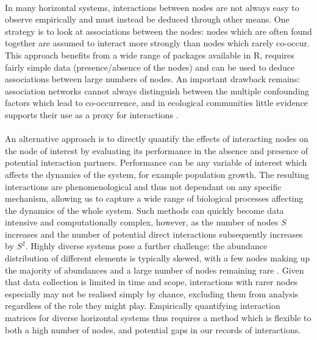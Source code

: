 \documentclass[a4,12pt]{article}
\begin{document}
    \paragraph{} 
    In many horizontal systems, interactions between nodes are not always easy to observe empirically and must instead be deduced through other means. One strategy is to look at associations between the nodes: nodes which are often found together are assumed to interact more strongly than nodes which rarely co-occur. This approach benefits from a wide range of packages available in R, requires fairly simple data (presence/absence of the nodes) and can be used to deduce associations between large numbers of nodes. An important drawback remains: association networks cannot always distinguish between the multiple confounding factors which lead to co-occurrence, and in ecological communities little evidence supports their use as a proxy for interactions \parencite{Sander2017,Barner2018, Thurman2019, Blanchet2020}.

    \paragraph{}
    An alternative approach is to directly quantify the effects of interacting nodes on the node of interest by evaluating its performance in the absence and presence of potential interaction partners. Performance can be any variable of interest which affects the dynamics of the system, for example population growth. The resulting interactions are phenomenological and thus not dependant on any specific mechanism, allowing us to capture a wide range of biological processes affecting the dynamics of the whole system. Such methods can quickly become data intensive and computationally complex, however, as the number of nodes $S$ increases and the number of potential direct interactions subsequently increases by $S^2$. Highly diverse systems pose a further challenge: the abundance distribution of different elements is typically skewed, with a few nodes making up the majority of abundances and a large number of nodes remaining rare \parencite{}. Given that data collection is limited in time and scope, interactions with rarer nodes especially may not be realised simply by chance, excluding them from analysis regardless of the role they might play. Empirically quantifying interaction matrices for diverse horizontal systems thus requires a method which is flexible to both a high number of nodes, and potential gaps in our records of interactions. 
\end{document}
